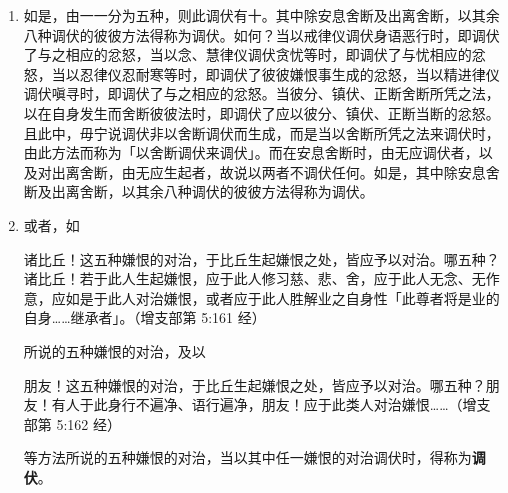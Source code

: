 \begin{enumerate}
\item 如是，由一一分为五种，则此调伏有十。其中除安息舍断及出离舍断，以其余八种调伏的彼彼方法得称为调伏。如何？当以戒律仪调伏身语恶行时，即调伏了与之相应的忿怒，当以念、慧律仪调伏贪忧等时，即调伏了与忧相应的忿怒，当以忍律仪忍耐寒等时，即调伏了彼彼嫌恨事生成的忿怒，当以精进律仪调伏嗔寻时，即调伏了与之相应的忿怒。当彼分、镇伏、正断舍断所凭之法，以在自身发生而舍断彼彼法时，即调伏了应以彼分、镇伏、正断当断的忿怒。且此中，毋宁说调伏非以舍断调伏而生成，而是当以舍断所凭之法来调伏时，由此方法而称为「以舍断调伏来调伏」。而在安息舍断时，由无应调伏者，以及对出离舍断，由无应生起者，故说以两者不调伏任何。如是，其中除安息舍断及出离舍断，以其余八种调伏的彼彼方法得称为调伏。
\item 或者，如\begin{quoting}诸比丘！这五种嫌恨的对治，于比丘生起嫌恨之处，皆应予以对治。哪五种？诸比丘！若于此人生起嫌恨，应于此人修习慈、悲、舍，应于此人无念、无作意，应如是于此人对治嫌恨，或者应于此人胜解业之自身性「此尊者将是业的自身……继承者」。（增支部第 5:161 经）\end{quoting}所说的五种嫌恨的对治，及以\begin{quoting}朋友！这五种嫌恨的对治，于比丘生起嫌恨之处，皆应予以对治。哪五种？朋友！有人于此身行不遍净、语行遍净，朋友！应于此类人对治嫌恨……（增支部第 5:162 经）\end{quoting}等方法所说的五种嫌恨的对治，当以其中任一嫌恨的对治调伏时，得称为\textbf{调伏}。

\end{enumerate}

